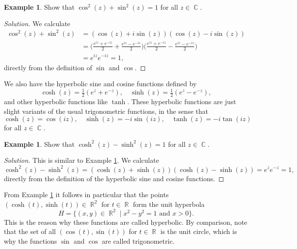 \documentclass{amsproc}
\theoremstyle{definition}
\newtheorem{example}[theorem]{Example}
\newenvironment{solution}{\begin{proof}[Solution]}{\end{proof}}
\theoremstyle{remark}
\DeclareMathOperator{\R}{\mathbb{R}}
\DeclareMathOperator{\C}{\mathbb{C}}
\numberwithin{equation}{section}
\begin{document}
\begin{example} \label{CME3.0}
Show that $ \cos^2(z) + \sin^2(z) = 1 $ for all $ z \in \C $.
\end{example}

\begin{solution}
We calculate
\begin{align*}
\cos^2(z) + \sin^2(z) &= (\cos(z) + i\sin(z))(\cos(z) - i\sin(z)) \\
&= \bigg(\frac{e^{iz} + e^{-iz}}{2} + \frac{e^{iz} - e^{-iz}}{2}\bigg) \bigg(\frac{e^{iz} + e^{-iz}}{2} - \frac{e^{iz} - e^{-iz}}{2}\bigg) \\
&= e^{iz} e^{-iz} = 1,
\end{align*}
directly from the definition of $ \sin $ and $ \cos $.
\end{solution}

We also have the hyperbolic sine and cosine functions defined by
$$
\cosh(z) = \tfrac{1}{2}(e^z + e^{-z}), \quad \sinh(z) = \tfrac{1}{2}(e^z - e^{-z}),
$$
and other hyperbolic functions like $ \tanh $. These hyperbolic functions are just slight variants of the usual trigonometric functions,
in the sense that
$$
\cosh(z) = \cos(iz), \quad \sinh(z) = -i\sin(iz), \quad \tanh(z) = -i \tan(iz)
$$
for all $ z \in \C $.

\begin{example} \label{CME3.0.5}
Show that $ \cosh^2(z) - \sinh^2(z) = 1 $ for all $ z \in \C $.
\end{example}

\begin{solution}
This is similar to Example \ref{CME3.0}. We calculate
$$
\cosh^2(z) - \sinh^2(z) = (\cosh(z) + \sinh(z))(\cosh(z) - \sinh(z)) = e^z e^{-z} = 1,
$$
directly from the definition of the hyperbolic sine and cosine functions.
\end{solution}

From Example \ref{CME3.0.5} it follows in particular that the points $ (\cosh(t), \sinh(t)) \in \R^2 $ for $ t \in \R $ form the unit hyperbola
$$
H = \{(x,y) \in \R^2 \mid x^2 - y^2 = 1 \text{ and } x > 0 \}.
$$
This is the reason why these functions are called hyperbolic. By comparison, note that the set of all $ (\cos(t), \sin(t)) $ for $ t \in \R $ is the unit circle, which is
why the functions $ \sin $ and $ \cos $ are called trigonometric.
\end{document}
